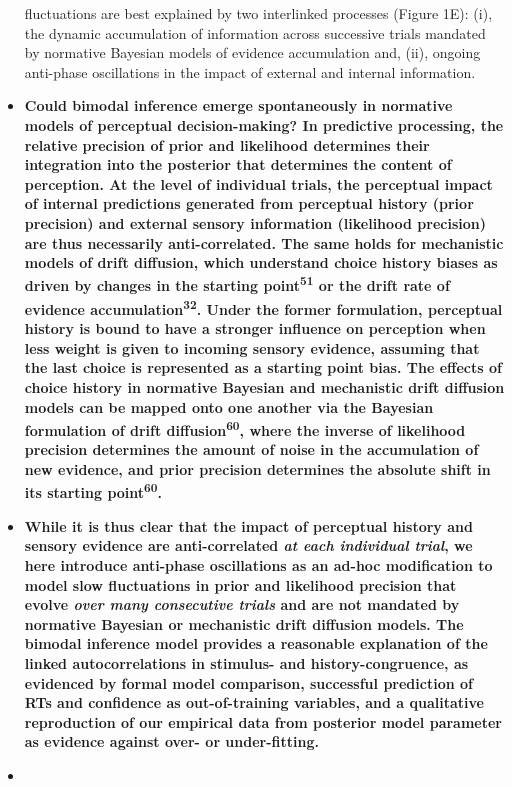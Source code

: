 \documentclass[
]{article}
\begin{document}
\begin{itemize}
{  fluctuations are best explained by two interlinked processes (Figure
  1E): (i), the dynamic accumulation of information across successive
  trials mandated by normative Bayesian models of evidence accumulation
  and, (ii), ongoing anti-phase oscillations in the impact of external
  and internal information.}
\item
  \textbf{Could bimodal inference emerge spontaneously in normative
  models of perceptual decision-making? In predictive processing, the
  relative precision of prior and likelihood determines their
  integration into the posterior that determines the content of
  perception. At the level of individual trials, the perceptual impact
  of internal predictions generated from perceptual history (prior
  precision) and external sensory information (likelihood precision) are
  thus necessarily anti-correlated. The same holds for mechanistic
  models of drift diffusion, which understand choice history biases as
  driven by changes in the starting point\textsuperscript{51} or the
  drift rate of evidence accumulation\textsuperscript{32}. Under the
  former formulation, perceptual history is bound to have a stronger
  influence on perception when less weight is given to incoming sensory
  evidence, assuming that the last choice is represented as a starting
  point bias. The effects of choice history in normative Bayesian and
  mechanistic drift diffusion models can be mapped onto one another via
  the Bayesian formulation of drift diffusion\textsuperscript{60}, where
  the inverse of likelihood precision determines the amount of noise in
  the accumulation of new evidence, and prior precision determines the
  absolute shift in its starting point\textsuperscript{60}.}
\item
  \textbf{While it is thus clear that the impact of perceptual history
  and sensory evidence are anti-correlated \emph{at each individual
  trial}, we here introduce anti-phase oscillations as an ad-hoc
  modification to model slow fluctuations in prior and likelihood
  precision that evolve \emph{over many consecutive trials} and are not
  mandated by normative Bayesian or mechanistic drift diffusion models.
  The bimodal inference model provides a reasonable explanation of the
  linked autocorrelations in stimulus- and history-congruence, as
  evidenced by formal model comparison, successful prediction of RTs and
  confidence as out-of-training variables, and a qualitative
  reproduction of our empirical data from posterior model parameter as
  evidence against over- or under-fitting.}
\item

\end{itemize}
\end{document}

